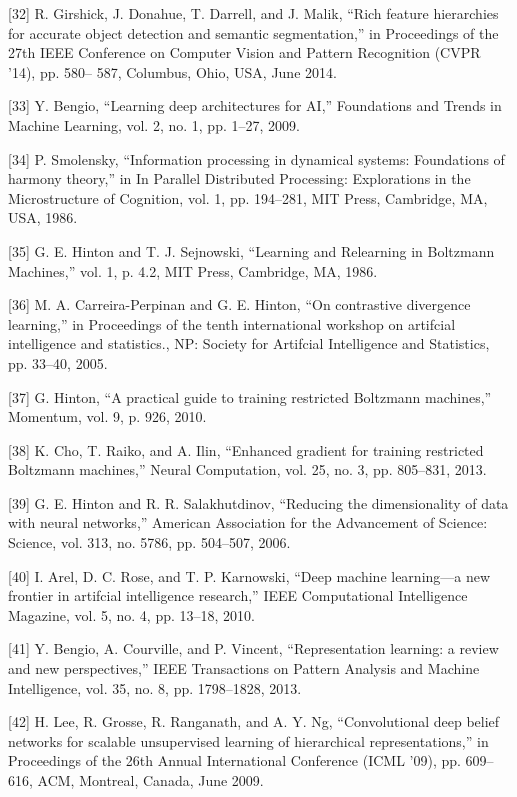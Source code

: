 \documentclass[a4paper]{article}
\begin{document}
[32] R. Girshick, J. Donahue, T. Darrell, and J. Malik, “Rich feature hierarchies for accurate object detection and semantic
segmentation,” in Proceedings of the 27th IEEE Conference on
Computer Vision and Pattern Recognition (CVPR ’14), pp. 580–
587, Columbus, Ohio, USA, June 2014.


[33] Y. Bengio, “Learning deep architectures for AI,” Foundations
and Trends in Machine Learning, vol. 2, no. 1, pp. 1–27, 2009.


[34] P. Smolensky, “Information processing in dynamical systems:
Foundations of harmony theory,” in In Parallel Distributed
Processing: Explorations in the Microstructure of Cognition, vol.
1, pp. 194–281, MIT Press, Cambridge, MA, USA, 1986.


[35] G. E. Hinton and T. J. Sejnowski, “Learning and Relearning in
Boltzmann Machines,” vol. 1, p. 4.2, MIT Press, Cambridge, MA,
1986.


[36] M. A. Carreira-Perpinan and G. E. Hinton, “On contrastive
divergence learning,” in Proceedings of the tenth international
workshop on artifcial intelligence and statistics., NP: Society for
Artifcial Intelligence and Statistics, pp. 33–40, 2005.


[37] G. Hinton, “A practical guide to training restricted Boltzmann
machines,” Momentum, vol. 9, p. 926, 2010.


[38] K. Cho, T. Raiko, and A. Ilin, “Enhanced gradient for training
restricted Boltzmann machines,” Neural Computation, vol. 25,
no. 3, pp. 805–831, 2013.


[39] G. E. Hinton and R. R. Salakhutdinov, “Reducing the dimensionality of data with neural networks,” American Association
for the Advancement of Science: Science, vol. 313, no. 5786, pp.
504–507, 2006.


[40] I. Arel, D. C. Rose, and T. P. Karnowski, “Deep machine learning—a new frontier in artifcial intelligence research,” IEEE
Computational Intelligence Magazine, vol. 5, no. 4, pp. 13–18,
2010.


[41] Y. Bengio, A. Courville, and P. Vincent, “Representation learning: a review and new perspectives,” IEEE Transactions on
Pattern Analysis and Machine Intelligence, vol. 35, no. 8, pp.
1798–1828, 2013.


[42] H. Lee, R. Grosse, R. Ranganath, and A. Y. Ng, “Convolutional
deep belief networks for scalable unsupervised learning of
hierarchical representations,” in Proceedings of the 26th Annual
International Conference (ICML ’09), pp. 609–616, ACM, Montreal, Canada, June 2009.
\end{document}
